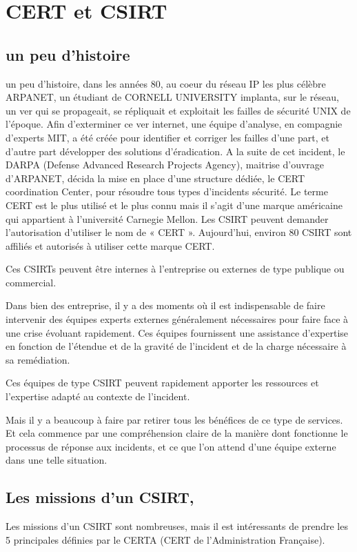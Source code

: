 \section{CERT et CSIRT}

\subsection{un peu d'histoire}
un peu d'histoire, dans les années 80, au coeur du réseau IP les plus célèbre ARPANET, un étudiant de CORNELL UNIVERSITY implanta, sur le réseau, un ver  qui se propageait, se répliquait et exploitait les failles de sécurité UNIX de l’époque. Afin d’exterminer ce ver internet, une équipe d’analyse, en compagnie d’experts MIT, a été créée pour identifier et corriger les failles d’une part, et d’autre part développer des solutions d’éradication. A la suite de cet incident, le DARPA (Defense Advanced Research Projects Agency), maitrise d’ouvrage d’ARPANET, décida la mise en place d’une structure dédiée, le CERT coordination Center, pour résoudre tous types d’incidents sécurité. Le terme CERT est le plus utilisé et le plus connu mais il s’agit d’une marque américaine qui appartient à l’université Carnegie Mellon. Les CSIRT peuvent demander l’autorisation d’utiliser le nom de « CERT ». Aujourd’hui, environ 80 CSIRT sont affiliés et autorisés à utiliser cette marque CERT.

Ces CSIRTs peuvent être internes à l'entreprise ou externes de type publique ou commercial.

Dans bien des entreprise, il y a des moments où il est indispensable de faire intervenir des équipes experts externes généralement nécessaires pour faire face à une crise évoluant rapidement. Ces équipes fournissent une assistance d'expertise en fonction de l’étendue et de la gravité de l’incident et de la charge nécessaire à sa remédiation.

Ces équipes de type CSIRT peuvent rapidement apporter les ressources et l’expertise adapté au contexte de l'incident.

 Mais il y a beaucoup à faire par retirer tous les bénéfices de ce type de services. Et cela commence par une compréhension claire de la manière dont fonctionne le processus de réponse aux incidents, et ce que l’on attend d’une équipe externe dans une telle situation.
 
 
  \subsection{Les missions d’un CSIRT,}
 Les missions d’un CSIRT sont nombreuses, mais il est intéressants de prendre les 5 principales définies par le CERTA (CERT de l'Administration Française).


